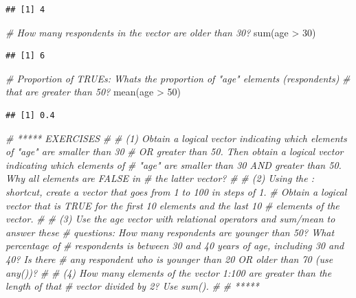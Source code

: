 \documentclass[
]{book}
\newenvironment{Shaded}{\begin{snugshade}}{\end{snugshade}}
\newcommand{\CommentTok}[1]{\textcolor[rgb]{0.56,0.35,0.01}{\textit{#1}}}
\newcommand{\DecValTok}[1]{\textcolor[rgb]{0.00,0.00,0.81}{#1}}
\newcommand{\FunctionTok}[1]{\textcolor[rgb]{0.00,0.00,0.00}{#1}}
\newcommand{\NormalTok}[1]{#1}
\newcommand{\SpecialCharTok}[1]{\textcolor[rgb]{0.00,0.00,0.00}{#1}}
\begin{document}
\begin{verbatim}
## [1] 4
\end{verbatim}

\begin{Shaded}
\begin{Highlighting}[]
\CommentTok{\# How many respondents in the vector are older than 30?}
\FunctionTok{sum}\NormalTok{(age }\SpecialCharTok{\textgreater{}} \DecValTok{30}\NormalTok{)}
\end{Highlighting}
\end{Shaded}

\begin{verbatim}
## [1] 6
\end{verbatim}

\begin{Shaded}
\begin{Highlighting}[]
\CommentTok{\# Proportion of TRUE\textquotesingle{}s: What\textquotesingle{}s the proportion of "age" elements (respondents)}
\CommentTok{\# that are greater than 50?}
\FunctionTok{mean}\NormalTok{(age }\SpecialCharTok{\textgreater{}} \DecValTok{50}\NormalTok{)}
\end{Highlighting}
\end{Shaded}

\begin{verbatim}
## [1] 0.4
\end{verbatim}

\begin{Shaded}
\begin{Highlighting}[]
\CommentTok{\# ***** EXERCISES}
\CommentTok{\#}
\CommentTok{\# (1) Obtain a logical vector indicating which elements of "age" are smaller than 30}
\CommentTok{\# OR greater than 50. Then obtain a logical vector indicating which elements of}
\CommentTok{\# "age" are smaller than 30 AND greater than 50. Why all elements are FALSE in}
\CommentTok{\# the latter vector?}
\CommentTok{\#}
\CommentTok{\# (2) Using the : shortcut, create a vector that goes from 1 to 100 in steps of 1.}
\CommentTok{\# Obtain a logical vector that is TRUE for the first 10 elements and the last 10}
\CommentTok{\# elements of the vector.}
\CommentTok{\#}
\CommentTok{\# (3) Use the age vector with relational operators and sum/mean to answer these}
\CommentTok{\# questions: How many respondents are younger than 50? What percentage of}
\CommentTok{\# respondents is between 30 and 40 years of age, including 30 and 40? Is there}
\CommentTok{\# any respondent who is younger than 20 OR older than 70 (use any())?}
\CommentTok{\#}
\CommentTok{\# (4) How many elements of the vector 1:100 are greater than the length of that }
\CommentTok{\# vector divided by 2? Use sum().}
\CommentTok{\#}
\CommentTok{\# *****}
\end{Highlighting}
\end{Shaded}
\end{document}
